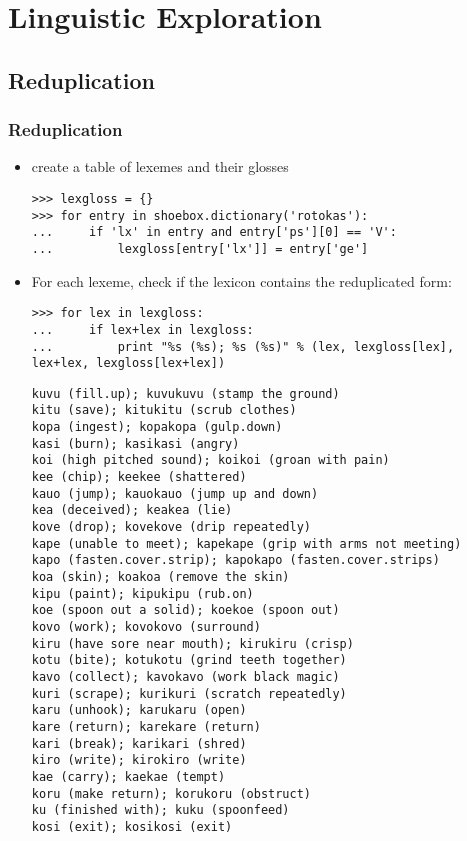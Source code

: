 \documentclass{beamer}             %
\begin{document}
\section{Linguistic Exploration}

\subsection{Reduplication}

\begin{frame}[fragile]
\frametitle{Reduplication}
\scriptsize
\begin{itemize}
\item create a table of lexemes and their glosses

\begin{verbatim}
>>> lexgloss = {}
>>> for entry in shoebox.dictionary('rotokas'):
...     if 'lx' in entry and entry['ps'][0] == 'V':
...         lexgloss[entry['lx']] = entry['ge']
\end{verbatim}

\item For each lexeme, check if the lexicon contains the reduplicated form:

\begin{verbatim}
>>> for lex in lexgloss:
...     if lex+lex in lexgloss:
...         print "%s (%s); %s (%s)" % (lex, lexgloss[lex], lex+lex, lexgloss[lex+lex])
\end{verbatim}

\tiny
\begin{verbatim}
kuvu (fill.up); kuvukuvu (stamp the ground)
kitu (save); kitukitu (scrub clothes)
kopa (ingest); kopakopa (gulp.down)
kasi (burn); kasikasi (angry)
koi (high pitched sound); koikoi (groan with pain)
kee (chip); keekee (shattered)
kauo (jump); kauokauo (jump up and down)
kea (deceived); keakea (lie)
kove (drop); kovekove (drip repeatedly)
kape (unable to meet); kapekape (grip with arms not meeting)
kapo (fasten.cover.strip); kapokapo (fasten.cover.strips)
koa (skin); koakoa (remove the skin)
kipu (paint); kipukipu (rub.on)
koe (spoon out a solid); koekoe (spoon out)
kovo (work); kovokovo (surround)
kiru (have sore near mouth); kirukiru (crisp)
kotu (bite); kotukotu (grind teeth together)
kavo (collect); kavokavo (work black magic)
kuri (scrape); kurikuri (scratch repeatedly)
karu (unhook); karukaru (open)
kare (return); karekare (return)
kari (break); karikari (shred)
kiro (write); kirokiro (write)
kae (carry); kaekae (tempt)
koru (make return); korukoru (obstruct)
ku (finished with); kuku (spoonfeed)
kosi (exit); kosikosi (exit)
\end{verbatim}
\end{itemize}
\end{frame}
\end{document}
